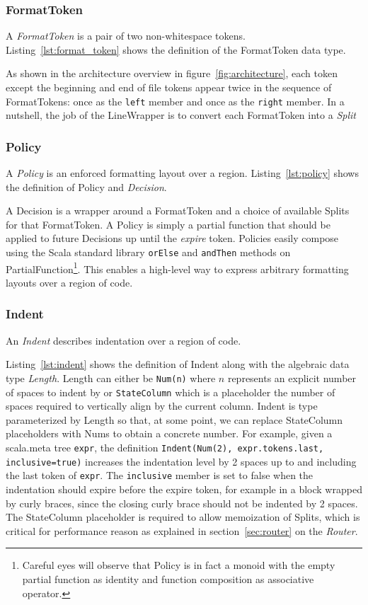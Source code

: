 \subsubsection{FormatToken}
A \emph{FormatToken} is a pair of two non-whitespace tokens.
Listing~\ref{lst:format_token} shows the definition of the FormatToken data type.

As shown in the architecture overview in figure~\ref{fig:architecture}, each token except the beginning and end of file tokens appear twice in the sequence of FormatTokens: once as the \texttt{left} member and once as the \texttt{right} member.
In a nutshell, the job of the LineWrapper is to convert each FormatToken into a \emph{Split}

\subsubsection{Policy}\label{sec:policy}
A \emph{Policy} is an enforced formatting layout over a region.
Listing~\ref{lst:policy} shows the definition of Policy and \emph{Decision}.

A Decision is a wrapper around a FormatToken and a choice of available Splits for that FormatToken.
A Policy is simply a partial function that should be applied to future Decisions up until the \emph{expire} token.
Policies easily compose using the Scala standard library \texttt{orElse} and \texttt{andThen} methods on PartialFunction\footnote{
  Careful eyes will observe that Policy is in fact a monoid with the empty partial function as identity and function composition as associative operator.}.
This enables a high-level way to express arbitrary formatting layouts over a region of code.

\subsubsection{Indent}\label{sec:indent}
An \emph{Indent} describes indentation over a region of code.

Listing~\ref{lst:indent} shows the definition of Indent along with the algebraic data type \emph{Length}.
Length can either be \texttt{Num(n)} where $n$ represents an explicit number of spaces to indent by or \texttt{StateColumn} which is a placeholder the number of spaces required to vertically align by the current column.
Indent is type parameterized by Length so that, at some point, we can replace StateColumn placeholders with Nums to obtain a concrete number.
For example, given a scala.meta tree \texttt{expr}, the definition \texttt{Indent(Num(2), expr.tokens.last, inclusive=true)}
increases the indentation level by 2 spaces up to and including the last token of \texttt{expr}.
The \texttt{inclusive} member is set to false when the indentation should expire before the expire token, for example in a block wrapped by curly braces, since the closing curly brace should not be indented by 2 spaces.
The StateColumn placeholder is required to allow memoization of Splits, which is critical for performance reason as explained in section~\ref{sec:router} on the \emph{Router}.

